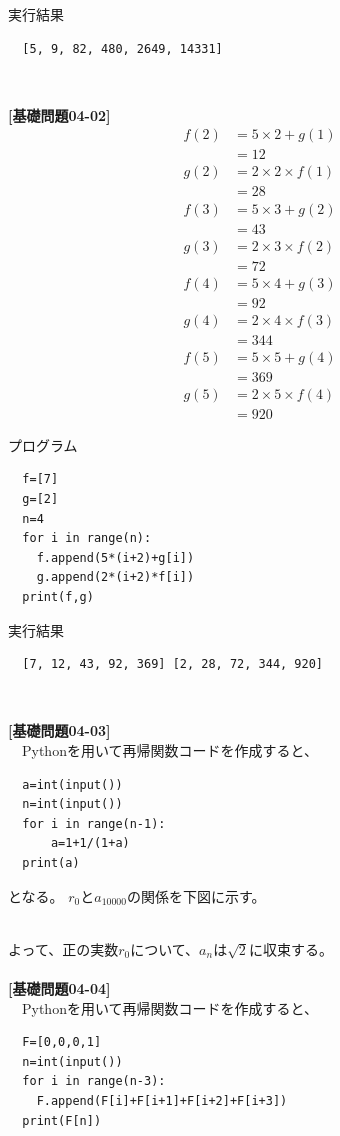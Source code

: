 \documentclass[a4paper,10.5pt]{ltjsarticle}
\begin{document}
\centerline{実行結果}
\begin{lstlisting}
  [5, 9, 82, 480, 2649, 14331]
\end{lstlisting}
\centerline{\ }
{\large\bfseries [基礎問題04-02]}\\
\begin{align*}
  f(2)&=5\times 2+g(1)\\
  &=12\\
  g(2)&=2\times 2\times f(1)\\
  &=28\\
  f(3)&=5\times 3+g(2)\\
  &=43\\
  g(3)&=2\times 3\times f(2)\\
  &=72\\
  f(4)&=5\times 4+g(3)\\
  &=92\\
  g(4)&=2\times 4\times f(3)\\
  &=344\\
  f(5)&=5\times 5+g(4)\\
  &=369\\
  g(5)&=2\times 5\times f(4)\\
  &=920
\end{align*}
\centerline{プログラム}
\begin{lstlisting}
  f=[7]
  g=[2]
  n=4
  for i in range(n):
    f.append(5*(i+2)+g[i])
    g.append(2*(i+2)*f[i])
  print(f,g)
\end{lstlisting}
\clearpage
\centerline{実行結果}
\begin{lstlisting}
  [7, 12, 43, 92, 369] [2, 28, 72, 344, 920]
\end{lstlisting}
\centerline{\ }
{\large\bfseries [基礎問題04-03]}\\
　Pythonを用いて再帰関数コードを作成すると、
\begin{lstlisting}
  a=int(input())
  n=int(input())
  for i in range(n-1):
      a=1+1/(1+a)
  print(a)
\end{lstlisting}
となる。
$r_0$と$a_{10000}$の関係を下図に示す。
\begin{figure}[h]
  \centering
  
\end{figure}\\
よって、正の実数$r_0$について、$a_n$は$\sqrt{2}$に収束する。\\
\\
{\large\bfseries [基礎問題04-04]}\\
　Pythonを用いて再帰関数コードを作成すると、
\begin{lstlisting}
  F=[0,0,0,1]
  n=int(input())
  for i in range(n-3):
    F.append(F[i]+F[i+1]+F[i+2]+F[i+3])
  print(F[n])
\end{lstlisting}
\end{document}
